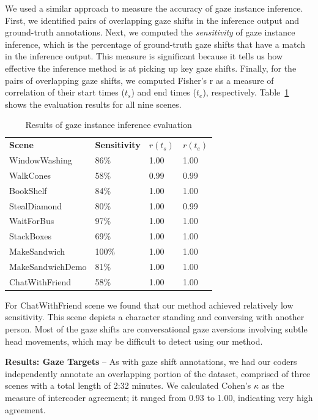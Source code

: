 We used a similar approach to measure the accuracy of gaze instance inference. First, we identified pairs of overlapping gaze shifts in the inference output and ground-truth annotations. Next, we computed the \emph{sensitivity} of gaze instance inference, which is the percentage of ground-truth gaze shifts that have a match in the inference output. This measure is significant because it tells us how effective the inference method is at picking up key gaze shifts. Finally, for the pairs of overlapping gaze shifts, we computed Fisher's r as a measure of correlation of their start times ($t_s$) and end times ($t_e$), respectively. Table~\ref{tab:GazeShiftInferenceResults} shows the evaluation results for all nine scenes.
%
\begin{table}
\centering
\def\arraystretch{1.5}
\begin{tabular}{|l||l|l|l|}
\hline
\textbf{Scene} & \textbf{Sensitivity} & $r(t_s)$ & $r(t_e)$ \\
\Xhline{2\arrayrulewidth}
WindowWashing & 86\% & 1.00 & 1.00 \\
WalkCones & 58\% & 0.99 & 0.99 \\
BookShelf & 84\% & 1.00 & 1.00 \\
StealDiamond & 80\% & 1.00 & 0.99 \\
WaitForBus & 97\% & 1.00 & 1.00 \\
StackBoxes & 69\% & 1.00 & 1.00 \\
MakeSandwich & 100\% & 1.00 & 1.00 \\
MakeSandwichDemo & 81\% & 1.00 & 1.00 \\
ChatWithFriend & 58\% & 1.00 & 1.00 \\
\hline
\end{tabular}
\caption{Results of gaze instance inference evaluation}
\label{tab:GazeShiftInferenceResults}
\end{table}
%
For ChatWithFriend scene we found that our method achieved relatively low sensitivity. This scene depicts a character standing and conversing with another person. Most of the gaze shifts are conversational gaze aversions involving subtle head movements, which may be difficult to detect using our method.

\noindent\textbf{Results: Gaze Targets} -- As with gaze shift annotations, we had our coders independently annotate an overlapping portion of the dataset, comprised of three scenes with a total length of 2:32 minutes. We calculated Cohen's $\kappa$ as the measure of intercoder agreement; it ranged from 0.93 to 1.00, indicating very high agreement.

